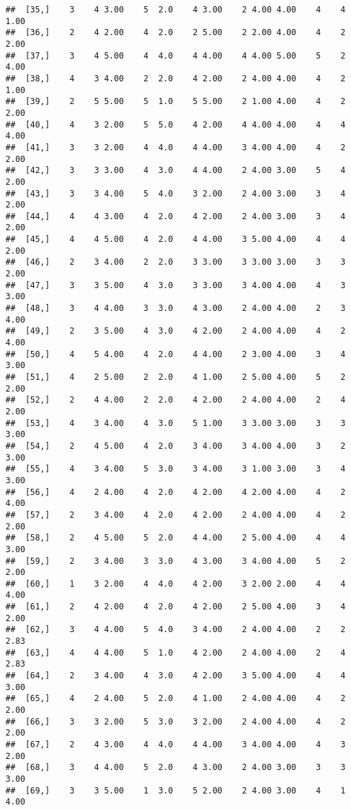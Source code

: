 \documentclass[]{article}
\begin{document}
\begin{verbatim}
##  [35,]    3    4 3.00    5  2.0    4 3.00    2 4.00 4.00    4    4 1.00
##  [36,]    2    4 2.00    4  2.0    2 5.00    2 2.00 4.00    4    2 2.00
##  [37,]    3    4 5.00    4  4.0    4 4.00    4 4.00 5.00    5    2 4.00
##  [38,]    4    3 4.00    2  2.0    4 2.00    2 4.00 4.00    4    2 1.00
##  [39,]    2    5 5.00    5  1.0    5 5.00    2 1.00 4.00    4    2 2.00
##  [40,]    4    3 2.00    5  5.0    4 2.00    4 4.00 4.00    4    4 4.00
##  [41,]    3    3 2.00    4  4.0    4 4.00    3 4.00 4.00    4    2 2.00
##  [42,]    3    3 3.00    4  3.0    4 4.00    2 4.00 3.00    5    4 2.00
##  [43,]    3    3 4.00    5  4.0    3 2.00    2 4.00 3.00    3    4 2.00
##  [44,]    4    4 3.00    4  2.0    4 2.00    2 4.00 3.00    3    4 2.00
##  [45,]    4    4 5.00    4  2.0    4 4.00    3 5.00 4.00    4    4 2.00
##  [46,]    2    3 4.00    2  2.0    3 3.00    3 3.00 3.00    3    3 2.00
##  [47,]    3    3 5.00    4  3.0    3 3.00    3 4.00 4.00    4    3 3.00
##  [48,]    3    4 4.00    3  3.0    4 3.00    2 4.00 4.00    2    3 4.00
##  [49,]    2    3 5.00    4  3.0    4 2.00    2 4.00 4.00    4    2 4.00
##  [50,]    4    5 4.00    4  2.0    4 4.00    2 3.00 4.00    3    4 3.00
##  [51,]    4    2 5.00    2  2.0    4 1.00    2 5.00 4.00    5    2 2.00
##  [52,]    2    4 4.00    2  2.0    4 2.00    2 4.00 4.00    2    4 2.00
##  [53,]    4    3 4.00    4  3.0    5 1.00    3 3.00 3.00    3    3 3.00
##  [54,]    2    4 5.00    4  2.0    3 4.00    3 4.00 4.00    3    2 3.00
##  [55,]    4    3 4.00    5  3.0    3 4.00    3 1.00 3.00    3    4 3.00
##  [56,]    4    2 4.00    4  2.0    4 2.00    4 2.00 4.00    4    2 4.00
##  [57,]    2    3 4.00    4  2.0    4 2.00    2 4.00 4.00    4    2 2.00
##  [58,]    2    4 5.00    5  2.0    4 4.00    2 5.00 4.00    4    4 3.00
##  [59,]    2    3 4.00    3  3.0    4 3.00    3 4.00 4.00    5    2 2.00
##  [60,]    1    3 2.00    4  4.0    4 2.00    3 2.00 2.00    4    4 4.00
##  [61,]    2    4 2.00    4  2.0    4 2.00    2 5.00 4.00    3    4 2.00
##  [62,]    3    4 4.00    5  4.0    3 4.00    2 4.00 4.00    2    2 2.83
##  [63,]    4    4 4.00    5  1.0    4 2.00    2 4.00 4.00    2    4 2.83
##  [64,]    2    3 4.00    4  3.0    4 2.00    3 5.00 4.00    4    4 3.00
##  [65,]    4    2 4.00    5  2.0    4 1.00    2 4.00 4.00    4    2 2.00
##  [66,]    3    3 2.00    5  3.0    3 2.00    2 4.00 4.00    4    2 2.00
##  [67,]    2    4 3.00    4  4.0    4 4.00    3 4.00 4.00    4    3 2.00
##  [68,]    3    4 4.00    5  2.0    4 3.00    2 4.00 3.00    3    3 3.00
##  [69,]    3    3 5.00    1  3.0    5 2.00    2 4.00 3.00    4    1 4.00

\end{verbatim}
\end{document}
